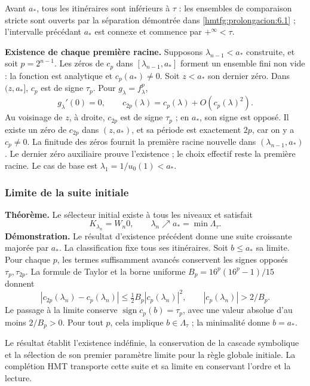 Avant \(a_*\), tous les itinéraires sont inférieurs à \(\tau\) : les ensembles de comparaison stricte sont ouverts par la séparation démontrée dans \ref{hmtfg:prolongacion:6.1} ; l’intervalle précédant \(a_*\) est connexe et commence par \(+^\infty<\tau\).

\textbf{Existence de chaque première racine.} Supposons \(\lambda_{n-1}<a_*\) construite, et soit \(p=2^{n-1}\). Les zéros de \(c_p\) dans \([\lambda_{n-1},a_*]\) forment un ensemble fini non vide : la fonction est analytique et \(c_p(a_*)\ne0\). Soit \(z<a_*\) son dernier zéro. Dans \((z,a_*]\), \(c_p\) est de signe \(\tau_p\). Pour \(g_\lambda=f_\lambda^p\),
\[
g_\lambda'(0)=0,\qquad
c_{2p}(\lambda)=c_p(\lambda)+O(c_p(\lambda)^2).
\]
Au voisinage de \(z\), à droite, \(c_{2p}\) est de signe \(\tau_p\) ; en \(a_*\), son signe est opposé. Il existe un zéro de \(c_{2p}\) dans \((z,a_*)\), et sa période est exactement \(2p\), car on y a \(c_p\ne0\). La finitude des zéros fournit la première racine nouvelle dans \((\lambda_{n-1},a_*)\). Le dernier zéro auxiliaire prouve l’existence ; le choix effectif reste la première racine. Le cas de base est \(\lambda_1=1/u_0(1)<a_*\).

\subsubsection{Limite de la suite initiale}
\label{hmtfg:escalado:15.2}

\textbf{Théorème.} Le sélecteur initial existe à tous les niveaux et satisfait
\begin{equation}
\boxed{K_{\lambda_n}=W_n0,\qquad
\lambda_n\nearrow a_*=\min\Lambda_\tau.}
\label{hmtfg:escalado:eq:50}
\end{equation}
\textbf{Démonstration.} Le résultat d’existence précédent donne une suite croissante majorée par \(a_*\). La classification fixe tous ses itinéraires. Soit \(b\le a_*\) sa limite. Pour chaque \(p\), les termes suffisamment avancés conservent les signes opposés \(\tau_p,\tau_{2p}\). La formule de Taylor et la borne uniforme \(B_p=16^p(16^p-1)/15\) donnent
\[
|c_{2p}(\lambda_n)-c_p(\lambda_n)|
\le\tfrac12 B_p|c_p(\lambda_n)|^2,\qquad
|c_p(\lambda_n)|>2/B_p.
\]
Le passage à la limite conserve \(\operatorname{sign}c_p(b)=\tau_p\), avec une valeur absolue d’au moins \(2/B_p>0\). Pour tout \(p\), cela implique \(b\in\Lambda_\tau\) ; la minimalité donne \(b=a_*\).

Le résultat établit l’existence indéfinie, la conservation de la cascade symbolique et la sélection de son premier paramètre limite pour la règle globale initiale. La complétion HMT transporte cette suite et sa limite en conservant l’ordre et la lecture.


